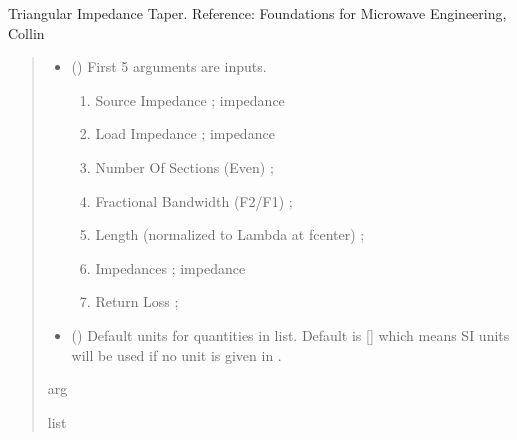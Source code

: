 \documentclass[letterpaper,10pt,english]{sphinxmanual}
\begin{document}

\begin{fulllineitems}
\label{\detokenize{components:components.Triangular_Taper_Impedance_Transformer}}
\pysigstartsignatures
{}
\pysigstopsignatures
\sphinxAtStartPar
Triangular Impedance Taper.
Reference:  Foundations for Microwave Engineering, Collin
\begin{quote}\begin{description}
\begin{itemize}
\item {}
\sphinxAtStartPar
{} () \textendash{}
\sphinxAtStartPar
First 5 arguments are inputs.
\begin{enumerate}
%
\item {}
\sphinxAtStartPar
Source Impedance ; impedance

\item {}
\sphinxAtStartPar
Load Impedance ; impedance

\item {}
\sphinxAtStartPar
Number Of Sections (Even) ;

\item {}
\sphinxAtStartPar
Fractional Bandwidth (F2/F1) ;

\item {}
\sphinxAtStartPar
Length (normalized to Lambda at fcenter) ;

\item {}
\sphinxAtStartPar
Impedances ; impedance

\item {}
\sphinxAtStartPar
Return Loss ;

\end{enumerate}


\item {}
\sphinxAtStartPar
{} (\sphinxstyleliteralemphasis{\sphinxupquote{, }}) \textendash{} Default units for quantities in  list. Default is {[}{]} which means SI units will be used if no unit is given in .

\end{itemize}

\sphinxAtStartPar
arg

\sphinxAtStartPar
list

\end{description}\end{quote}

\end{fulllineitems}
\end{document}

